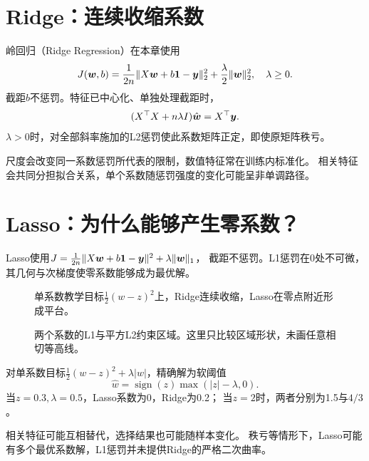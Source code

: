 
\section{Ridge：连续收缩系数}
\label{sec:linear-ridge}
岭回归（Ridge Regression）在本章使用
\[
 J(\boldsymbol{w},b)=\frac1{2n}\lVert X\boldsymbol{w}+b\boldsymbol{1}-\boldsymbol{y}\rVert_2^2
 +\frac\lambda2\lVert\boldsymbol{w}\rVert_2^2,\quad\lambda\geq0.
\]
截距$b$不惩罚。特征已中心化、单独处理截距时，
\[
 (X^\top X+n\lambda I)\hat{\boldsymbol{w}}=X^\top\boldsymbol{y}.
\]
$\lambda>0$时，对全部斜率施加的L2惩罚使此系数矩阵正定，即使原矩阵秩亏。



尺度会改变同一系数惩罚所代表的限制，数值特征常在训练内标准化。
相关特征会共同分担拟合关系，单个系数随惩罚强度的变化可能呈非单调路径。

\section{Lasso：为什么能够产生零系数？}
\label{sec:linear-lasso}
Lasso使用$J=\frac1{2n}\lVert X\boldsymbol{w}+b\boldsymbol{1}-\boldsymbol{y}\rVert^2+\lambda\lVert\boldsymbol{w}\rVert_1$，
截距不惩罚。L1惩罚在0处不可微，其几何与次梯度使零系数能够成为最优解。

\begin{figure}[htbp]
\centering
\caption{单系数教学目标$\frac12(w-z)^2$上，Ridge连续收缩，Lasso在零点附近形成平台。}
\par\smallskip
{}
\end{figure}

\begin{figure}[htbp]
\centering
\caption{两个系数的L1与平方L2约束区域。这里只比较区域形状，未画任意相切等高线。}
\par\smallskip
{}
\end{figure}

对单系数目标$\frac12(w-z)^2+\lambda|w|$，精确解为软阈值
\[
 \hat w=\operatorname{sign}(z)\max(|z|-\lambda,0).
\]
当$z=0.3,\lambda=0.5$，Lasso系数为0，Ridge为0.2；
当$z=2$时，两者分别为1.5与$4/3$。

\begin{pitfall}[稀疏解与选择稳定性]
相关特征可能互相替代，选择结果也可能随样本变化。
秩亏等情形下，Lasso可能有多个最优系数解，L1惩罚并未提供Ridge的严格二次曲率。
\end{pitfall}

